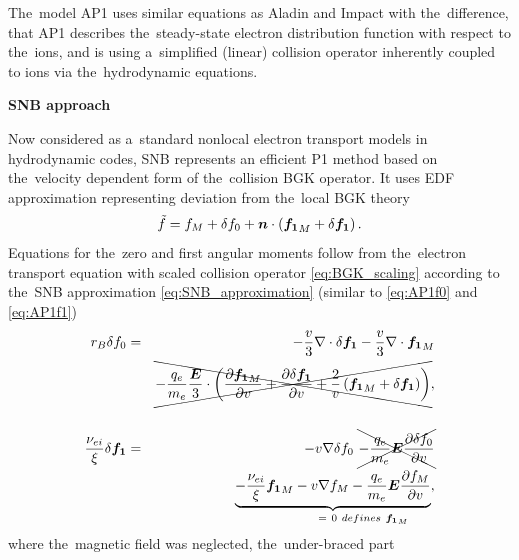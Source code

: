 The~model AP1 uses similar equations as Aladin
and Impact with the~difference, that AP1 describes the~steady-state 
electron distribution function with respect to the~ions,
and is using a~simplified (linear) collision operator inherently
coupled to ions via the~hydrodynamic equations.


\textbf{SNB approach}

Now considered as a~standard nonlocal electron transport models in hydrodynamic 
codes, SNB \cite{Schurtz_2000} represents an efficient P1 method based on
the~velocity dependent form of the~collision BGK operator. It uses EDF 
approximation representing deviation from the~local BGK theory
\begin{equation}
  \tilde{f} = 
  f_M + \delta f_0 
  + \boldsymbol{n}\cdot\left({\boldsymbol{f_1}}_M + \delta{\boldsymbol{f_1}}\right) . 
  \label{eq:SNB_approximation}
\end{equation}
Equations for the~zero and first angular moments follow from 
the~electron transport equation with scaled collision operator 
\eqref{eq:BGK_scaling}
according to the~SNB approximation \eqref{eq:SNB_approximation} 
(similar to \eqref{eq:AP1f0} and \eqref{eq:AP1f1})
\begin{eqnarray}
  r_B \delta f_0 &=&
  - \frac{v}{3}\nabla\cdot\delta{\boldsymbol{f_1}}
  - \frac{v}{3}\nabla\cdot{\boldsymbol{f_1}}_M
  \nonumber\\ 
  &&\xcancel{- \frac{q_e}{m_e}\frac{\boldsymbol{E}}{3}\cdot\left(
  \frac{\partial{{\boldsymbol{f_1}}_M}}{\partial{v}} + \frac{\partial{\delta{\boldsymbol{f_1}}}}{\partial{v}} 
  + \frac{2}{v}\left({\boldsymbol{f_1}}_M + \delta{\boldsymbol{f_1}}\right)\right)} , 
  \nonumber \\
  \label{eq:SNBf0}\\
  \frac{\nu_{ei}}{\xi}\delta{\boldsymbol{f_1}} &=& - v\nabla\delta f_0 
  ~\xcancel{- \frac{q_e}{m_e}\boldsymbol{E}\frac{\partial{\delta f_0}}{\partial{v}}}
  \nonumber \\
  &&\underbrace{- \frac{\nu_{ei}}{\xi}{\boldsymbol{f_1}}_M - v\nabla f_M
  - \frac{q_e}{m_e}\boldsymbol{E}\frac{\partial{f_M}}{\partial{v}}
  }_{~~~~~~~~~~~~~=~0~defines~{\boldsymbol{f_1}}_M} 
  ,
  \nonumber \\
  \label{eq:SNBf1}
\end{eqnarray}
where the~magnetic field was neglected, the~under-braced part
